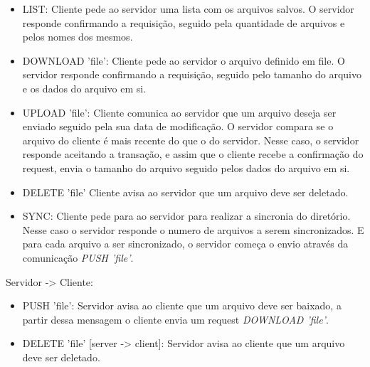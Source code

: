 \documentclass[a4paper]{article}
\begin{document}
\begin{itemize}
\item LIST:
\newline Cliente pede ao servidor uma lista com os arquivos salvos. O servidor responde confirmando a requisição, seguido pela quantidade de arquivos e pelos nomes dos mesmos.

\item DOWNLOAD 'file':
\newline Cliente pede ao servidor o arquivo definido em file. O servidor responde confirmando a requisição, seguido pelo tamanho do arquivo e os dados do arquivo em si.

\item UPLOAD 'file':
\newline Cliente comunica ao servidor que um arquivo deseja ser enviado seguido pela sua data de modificação. O servidor compara se o arquivo do cliente é mais recente do que o do servidor. Nesse caso, o servidor responde aceitando a transação, e assim que o cliente recebe a confirmação do request, envia o tamanho do arquivo seguido pelos dados do arquivo em si.

\item DELETE 'file'
\newline Cliente avisa ao servidor que um arquivo deve ser deletado.

\item SYNC:
\newline Cliente pede para ao servidor para realizar a sincronia do diretório. Nesse caso o servidor responde o numero de arquivos a serem sincronizados. E para cada arquivo a ser sincronizado, o servidor começa o envio através da comunicação \textit{PUSH 'file'}.
\end{itemize}

Servidor -> Cliente:

\begin{itemize}

\item PUSH 'file':
\newline Servidor avisa ao cliente que um arquivo deve ser baixado, a partir dessa mensagem o cliente envia um request \textit{DOWNLOAD 'file'}.

\item DELETE 'file' [server -> client]:
\newline Servidor avisa ao cliente que um arquivo deve ser deletado.

\end{itemize}
\end{document}
